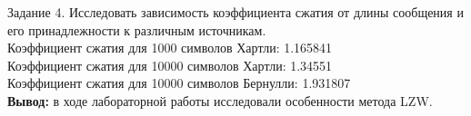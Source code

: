 \documentclass[a4paper,14pt]{extarticle}
\begin{document}
Задание 4. Исследовать зависимость коэффициента сжатия от длины сообщения и его принадлежности к различным источникам.\\

Коэффициент сжатия для 1000 символов Хартли: 1.165841\\
Коэффициент сжатия для 10000 символов Хартли: 1.34551\\
Коэффициент сжатия для 10000 символов Бернулли: 1.931807\\

\textbf{Вывод: } в ходе лабораторной работы исследовали особенности метода LZW. 
\end{document}
